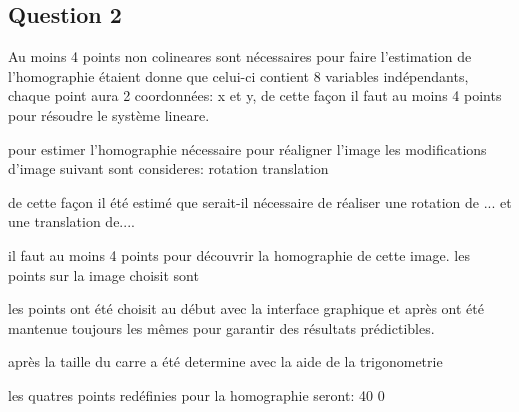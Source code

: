 \documentclass[../CSC_5RO17_TA_TP1.tex]{subfiles}
\begin{document}
\subsection*{Question 2}
Au moins 4 points non colineares sont nécessaires pour faire l'estimation de l'homographie étaient donne que celui-ci contient 8 variables indépendants, chaque point aura 2 coordonnées: x et y, de cette façon il faut au moins 4 points pour résoudre le système lineare.

pour estimer l'homographie nécessaire pour réaligner l'image les modifications d'image suivant sont consideres:
rotation
translation

de cette façon il été estimé que serait-il nécessaire de réaliser une rotation de ... et une translation de....

il faut au moins 4 points pour découvrir la homographie de cette image.
les points sur la image choisit sont

les points ont été choisit au début avec la interface graphique et après ont été mantenue toujours les mêmes pour garantir des résultats prédictibles.

après la taille du carre a été determine avec la aide de la trigonometrie


les quatres points redéfinies pour la homographie seront:
40 0
\end{document}
